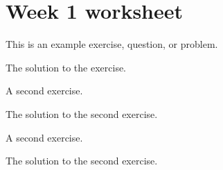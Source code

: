 \section{Week 1 worksheet}

\begin{exercise}
    This is an example exercise, question, or problem.
\end{exercise}

\begin{solution}
    The solution to the exercise.
\end{solution}


\begin{exercise}
    A second exercise.
\end{exercise}

\begin{solution}
    The solution to the second exercise.
\end{solution}


\begin{exercise}
    A second exercise.
\end{exercise}

\begin{solution}
    The solution to the second exercise.
\end{solution}
